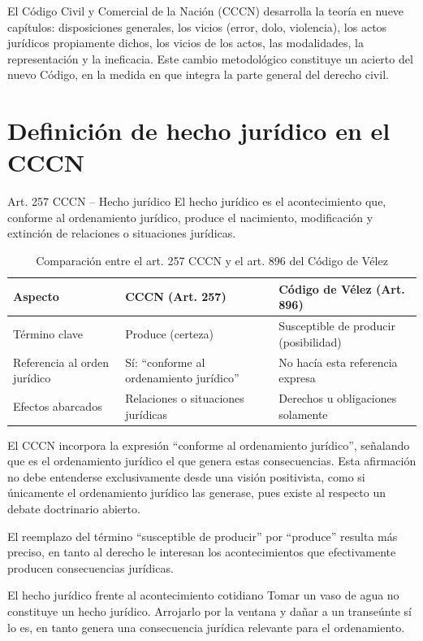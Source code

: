 \documentclass[12pt,oneside]{book}
\begin{document}
El Código Civil y Comercial de la Nación (CCCN) desarrolla la teoría en nueve capítulos: disposiciones generales, los vicios (error, dolo, violencia), los actos jurídicos propiamente dichos, los vicios de los actos, las modalidades, la representación y la ineficacia. Este cambio metodológico constituye un acierto del nuevo Código, en la medida en que integra la parte general del derecho civil.

\section{Definición de hecho jurídico en el CCCN}

\begin{definition}{Art. 257 CCCN -- Hecho jurídico}
El hecho jurídico es el acontecimiento que, conforme al ordenamiento jurídico, produce el nacimiento, modificación y extinción de relaciones o situaciones jurídicas.
\end{definition}

\begin{table}[H]
\centering
\caption{Comparación entre el art. 257 CCCN y el art. 896 del Código de Vélez}
\begin{tabularx}{\textwidth}{l X X}
\toprule
\textbf{Aspecto} & \textbf{CCCN (Art. 257)} & \textbf{Código de Vélez (Art. 896)} \\
\midrule
Término clave & Produce (certeza) & Susceptible de producir (posibilidad) \\
Referencia al orden jurídico & Sí: ``conforme al ordenamiento jurídico'' & No hacía esta referencia expresa \\
Efectos abarcados & Relaciones o situaciones jurídicas & Derechos u obligaciones solamente \\
\bottomrule
\end{tabularx}
\end{table}

El CCCN incorpora la expresión ``conforme al ordenamiento jurídico'', señalando que es el ordenamiento jurídico el que genera estas consecuencias. Esta afirmación no debe entenderse exclusivamente desde una visión positivista, como si únicamente el ordenamiento jurídico las generase, pues existe al respecto un debate doctrinario abierto.

El reemplazo del término ``susceptible de producir'' por ``produce'' resulta más preciso, en tanto al derecho le interesan los acontecimientos que efectivamente producen consecuencias jurídicas.

\begin{example}{El hecho jurídico frente al acontecimiento cotidiano}
Tomar un vaso de agua no constituye un hecho jurídico. Arrojarlo por la ventana y dañar a un transeúnte sí lo es, en tanto genera una consecuencia jurídica relevante para el ordenamiento.
\end{example}
\end{document}
